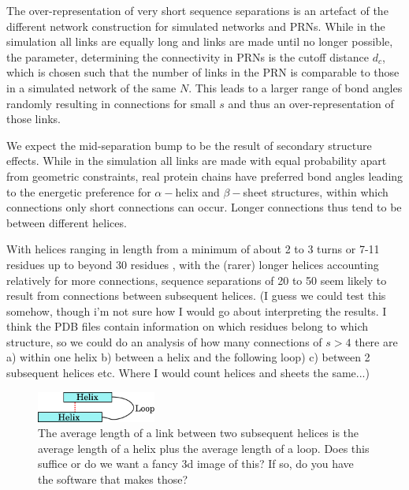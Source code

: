 \documentclass[reprint,amsmath,amssymb,rmp,onecolumn,notitlepage,11pt]{revtex4-1}
\newcommand{\red}[1]{\textcolor{red!80!black}{#1}}
\begin{document}
The over-representation of very short sequence separations is an artefact of the different network construction for simulated networks and PRNs. While in the simulation all links are equally long and links are made until no longer possible, the parameter, determining the connectivity in PRNs is the cutoff distance $d_c$, which is chosen such that the number of links in the PRN is comparable to those in a simulated network of the same $N$. This leads to a larger range of bond angles randomly resulting in connections for small $s$ and thus an over-representation of those links.

We expect the mid-separation bump to be the result of secondary structure effects. While in the simulation all links are made with equal probability apart from geometric constraints, real protein chains have preferred bond angles leading to the energetic preference for $\alpha-$helix and $\beta-$sheet structures, within which connections only short connections can occur. Longer connections thus tend to be between different helices.

\red{With helices ranging in length from a minimum of about 2 to 3 turns or 7-11 residues up to beyond 30 residues \cite{manning1988circular}, with the (rarer) longer helices accounting relatively for more connections, sequence separations of 20 to 50 seem likely to result from connections between subsequent helices. (I guess we could test this somehow, though i'm not sure how I would go about interpreting the results. I think the PDB files contain information on which residues belong to which structure, so we could do an analysis of how many connections of $s>4$ there are a) within one helix b) between a helix and the following loop) c) between 2 subsequent helices etc. Where I would count helices and sheets the same...)}
\begin{figure}[h]
        \centering
	\includegraphics[width=0.35\textwidth]{paper/figures/neighbouring_helices.pdf}
        \caption{The average length of a link between two subsequent helices is the average length of a helix plus the average length of a loop. \red{Does this suffice or do we want a fancy 3d image of this? If so, do you have the software that makes those?}
        }
        \label{fig:bumpexplain}
\end{figure}
\end{document}
